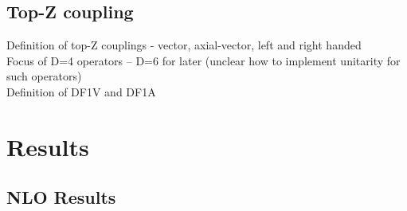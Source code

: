 \documentclass[preprint]{JHEP3} %
\begin{document}
\subsection{Top-Z coupling}
Definition of top-Z couplings - vector, axial-vector, left and right handed \\
Focus of D=4 operators -- D=6 for later (unclear how to implement unitarity for such operators) \\
Definition of DF1V and DF1A

\section{Results}
\subsection{NLO Results}
\end{document}
